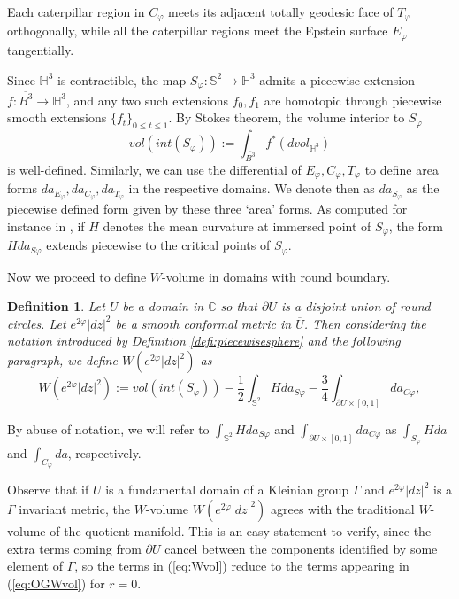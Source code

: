 \documentclass[12pt]{amsart}
\newtheorem{defi}{Definition}[section]
\begin{document}
Each caterpillar region in $C_\varphi$ meets its adjacent totally geodesic face of $T_\varphi$ orthogonally, while all the caterpillar regions meet the Epstein surface $E_\varphi$ tangentially.

Since $\mathbb{H}^3$ is contractible, the map $S_\varphi:\mathbb{S}^2\rightarrow\mathbb{H}^3$ admits a piecewise extension $f:\overline{B^3}\rightarrow\mathbb{H}^3$, and any two such extensions $f_0, f_1$ are homotopic through piecewise smooth extensions $\lbrace f_t\rbrace_{0\leq t\leq1}$. By Stokes theorem, the volume interior to $S_\varphi$
\begin{equation}
    vol(int(S_\varphi)) := \int_{\overline{B^3}} f^*(dvol_{\mathbb{H}^3})
\end{equation}
is well-defined. Similarly, we can use the differential of $E_\varphi, C_\varphi, T_\varphi$ to define area forms $da_{E_\varphi}, da_{C_\varphi}, da_{T_\varphi}$ in the respective domains. We denote then as $da_{S_\varphi}$ as the piecewise defined form given by these three `area' forms. As computed for instance in \cite{KrasnovSchlenker08}, if $H$ denotes the mean curvature at immersed point of $S_\varphi$, the form $Hda_{S\varphi}$ extends piecewise to the critical points of $S_\varphi$.

Now we proceed to define $W$-volume in domains with round boundary.

\begin{defi} Let $U$ be a domain in $\mathbb{C}$ so that $\partial U$ is a disjoint union of round circles. Let $e^{2\varphi}|dz|^2$ be a smooth conformal metric in $\overline{U}$. Then considering the notation introduced by Definition \ref{defi:piecewisesphere} and the following paragraph, we define $W(e^{2\varphi}|dz|^2)$ as
\begin{equation}\label{eq:Wvol}
    W(e^{2\varphi}|dz|^2) := vol(int(S_\varphi)) - \frac12 \int_{\mathbb{S}^2} Hda_{S\varphi} - \frac34 \int_{\partial U\times[0,1]} da_{C\varphi},
\end{equation}
\end{defi}
By abuse of notation, we will refer to $\int_{\mathbb{S}^2} Hda_{S\varphi}$ and $\int_{\partial U\times[0,1]} da_{C\varphi}$ as $\int_{S_\varphi}Hda$ and $\int_{C_\varphi}da$, respectively.

Observe that if $U$ is a fundamental domain of a Kleinian group $\Gamma$ and $e^{2\varphi}|dz|^2$ is a $\Gamma$ invariant metric, the $W$-volume $W(e^{2\varphi}|dz|^2)$ agrees with the traditional $W$-volume of the quotient manifold. This is an easy statement to verify, since the extra terms coming from $\partial U$ cancel between the components identified by some element of $\Gamma$, so the terms in (\ref{eq:Wvol}) reduce to the terms appearing in (\ref{eq:OGWvol}) for $r=0$.
\end{document}
